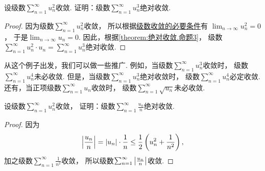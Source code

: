 \begin{example}
设级数\(\sum_{n=1}^\infty u_n^2\)收敛.
证明：级数\(\sum_{n=1}^\infty u_n^3\)绝对收敛.
\begin{proof}
因为级数\(\sum_{n=1}^\infty u_n^2\)收敛，
所以根据\hyperref[theorem:无穷级数.级数收敛的必要条件]{级数收敛的必要条件}有
\(\lim_{n\to\infty} u_n^2 = 0\)，
于是\(\lim_{n\to\infty} u_n = 0\).
因此，根据\cref{theorem:绝对收敛.命题3}，
级数\(\sum_{n=1}^\infty u_n^2 \cdot u_n
= \sum_{n=1}^\infty u_n^3\)绝对收敛.
\end{proof}
\end{example}
从这个例子出发，我们可以做一些推广.
例如，当级数\(\sum_{n=1}^\infty u_n^3\)收敛时，
级数\(\sum_{n=1}^\infty u_n^4\)未必收敛.
但是，当级数\(\sum_{n=1}^\infty u_n^3\)绝对收敛时，
级数\(\sum_{n=1}^\infty u_n^4\)必定收敛.
还有，当正项级数\(\sum_{n=1}^\infty u_n\)收敛时，
级数\(\sum_{n=1}^\infty \sqrt{u_n}\)未必收敛.

\begin{example}
设级数\(\sum_{n=1}^\infty u_n^2\)收敛，
证明：级数\(\sum_{n=1}^\infty \frac{u_n}{n}\)绝对收敛.
\begin{proof}
因为\[
	\abs{\frac{u_n}{n}}
	= \abs{u_n} \cdot \frac{1}{n}
	\leq \frac12 \left( u_n^2 + \frac{1}{n^2} \right),
\]
加之级数\(\sum_{n=1}^\infty \frac{1}{n^2}\)收敛，
所以级数\(\sum_{n=1}^\infty \abs{\frac{u_n}{n}}\)收敛.
\end{proof}
\end{example}
